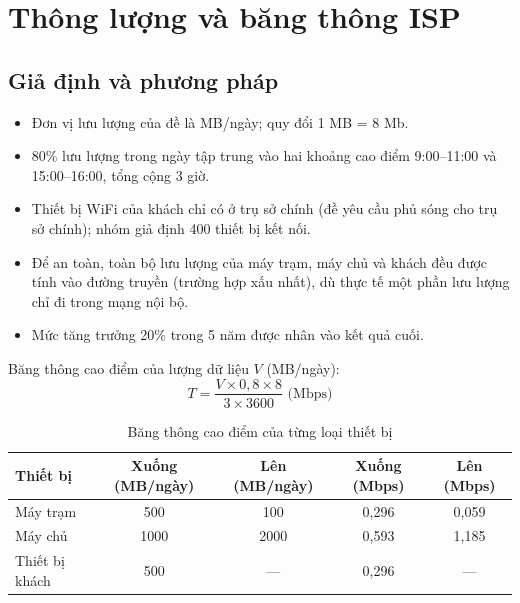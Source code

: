 \section{Thông lượng và băng thông ISP}

\subsection{Giả định và phương pháp}
\begin{itemize}
    \item Đơn vị lưu lượng của đề là MB/ngày; quy đổi 1 MB = 8 Mb.
    \item 80\% lưu lượng trong ngày tập trung vào hai khoảng cao điểm 9:00--11:00 và 15:00--16:00, tổng cộng 3 giờ.
    \item Thiết bị WiFi của khách chỉ có ở trụ sở chính (đề yêu cầu phủ sóng cho trụ sở chính); nhóm giả định 400 thiết bị kết nối.
    \item Để an toàn, toàn bộ lưu lượng của máy trạm, máy chủ và khách đều được tính vào đường truyền (trường hợp xấu nhất), dù thực tế một phần lưu lượng chỉ đi trong mạng nội bộ.
    \item Mức tăng trưởng 20\% trong 5 năm được nhân vào kết quả cuối.
\end{itemize}

Băng thông cao điểm của lượng dữ liệu $V$ (MB/ngày):
\[
    T = \frac{V \times 0{,}8 \times 8}{3 \times 3600} \text{ (Mbps)}
\]

\begin{table}[H]
    \centering
    \renewcommand{\arraystretch}{1.4}
    \begin{tabular}{lcccc}
        \hline
        \textbf{Thiết bị} & \textbf{Xuống (MB/ngày)} & \textbf{Lên (MB/ngày)} & \textbf{Xuống (Mbps)} & \textbf{Lên (Mbps)} \\ \hline
        Máy trạm & 500 & 100 & 0,296 & 0,059 \\ \hline
        Máy chủ & 1000 & 2000 & 0,593 & 1,185 \\ \hline
        Thiết bị khách & 500 & --- & 0,296 & --- \\ \hline
    \end{tabular}
    \caption{Băng thông cao điểm của từng loại thiết bị}
\end{table}

